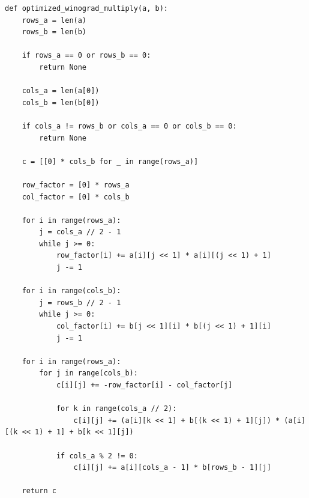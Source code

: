 \begin{lstlisting}[style=python, label=lst:optwyn,caption=Оптимизированный алгоритм Винограда]
def optimized_winograd_multiply(a, b):
    rows_a = len(a)
    rows_b = len(b)

    if rows_a == 0 or rows_b == 0:
        return None

    cols_a = len(a[0])
    cols_b = len(b[0])

    if cols_a != rows_b or cols_a == 0 or cols_b == 0:
        return None

    c = [[0] * cols_b for _ in range(rows_a)]

    row_factor = [0] * rows_a
    col_factor = [0] * cols_b

    for i in range(rows_a):
        j = cols_a // 2 - 1
        while j >= 0:
            row_factor[i] += a[i][j << 1] * a[i][(j << 1) + 1]
            j -= 1

    for i in range(cols_b):
        j = rows_b // 2 - 1
        while j >= 0:
            col_factor[i] += b[j << 1][i] * b[(j << 1) + 1][i]
            j -= 1

    for i in range(rows_a):
        for j in range(cols_b):
            c[i][j] += -row_factor[i] - col_factor[j]

            for k in range(cols_a // 2):
                c[i][j] += (a[i][k << 1] + b[(k << 1) + 1][j]) * (a[i][(k << 1) + 1] + b[k << 1][j])

            if cols_a % 2 != 0:
                c[i][j] += a[i][cols_a - 1] * b[rows_b - 1][j]

    return c
\end{lstlisting}

\clearpage


